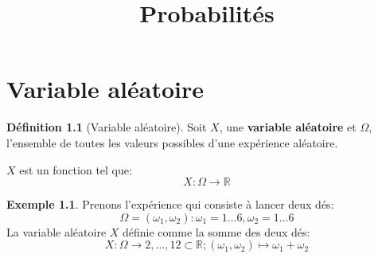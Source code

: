\documentclass[12pt]{book}
\title{Probabilités}
\let\Bbb\mathbb
\theoremstyle{definition}
\newtheorem{definition}{Définition}[section]
\newtheorem*{example}{Exemple}
\begin{document}
\chapter{Variable aléatoire}
\begin{definition}[Variable aléatoire]
    \label{def:variable_aleatoire}
    Soit $X$, une \textbf{variable aléatoire} et $\Omega$, l'ensemble de toutes les valeurs possibles
    d'une expérience aléatoire.

    $X$ est un fonction tel que:
    $$ X: \Omega \to \Bbb R$$
\end{definition}

\begin{example}
    Prenons l'expérience qui consiste à lancer deux dés:
    $$ \Omega = {(\omega_1, \omega_2): \omega_1 = 1 \dots 6, \omega_2 = 1 \dots 6} $$
    La variable aléatoire $X$ définie comme la somme des deux dés:
    $$ X : \Omega \to {2, \dots, 12} \subset \Bbb R; (\omega_1, \omega_2) \mapsto \omega_1 + \omega_2 $$
\end{example}
\end{document}
